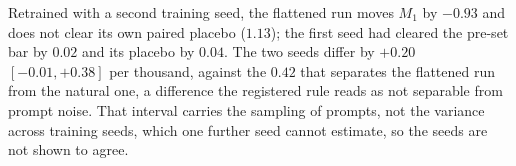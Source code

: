 Retrained with a second training seed, the flattened run moves $M_1$ by $-0.93$ and does not clear its own paired placebo ($1.13$); the first seed had cleared the pre-set bar by $0.02$ and its placebo by $0.04$. The two seeds differ by $+0.20$ $[-0.01,+0.38]$ per thousand, against the $0.42$ that separates the flattened run from the natural one, a difference the registered rule reads as not separable from prompt noise. That interval carries the sampling of prompts, not the variance across training seeds, which one further seed cannot estimate, so the seeds are not shown to agree.
